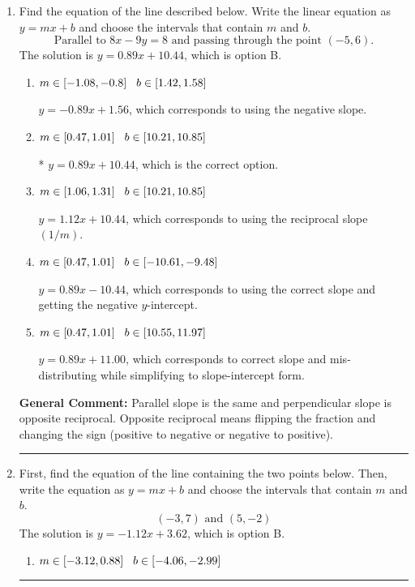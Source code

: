 \documentclass{extbook}[14pt]
\newcommand{\litem}[1]{\item #1

\rule{\textwidth}{0.4pt}}
\begin{document}
\begin{enumerate}\litem{
Find the equation of the line described below. Write the linear equation as $ y=mx+b $ and choose the intervals that contain $m$ and $b$.
\[ \text{Parallel to } 8 x - 9 y = 8 \text{ and passing through the point } (-5, 6). \]The solution is \( y = 0.89x + 10.44 \), which is option B.\begin{enumerate}[label=\Alph*.]
\item \( m \in [-1.08, -0.8] \hspace*{3mm} b \in [1.42, 1.58] \)

 $y = -0.89x + 1.56$, which corresponds to using the negative slope.
\item \( m \in [0.47, 1.01] \hspace*{3mm} b \in [10.21, 10.85] \)

* $y = 0.89x + 10.44$, which is the correct option.
\item \( m \in [1.06, 1.31] \hspace*{3mm} b \in [10.21, 10.85] \)

 $y = 1.12x + 10.44$, which corresponds to using the reciprocal slope $(1/m)$.
\item \( m \in [0.47, 1.01] \hspace*{3mm} b \in [-10.61, -9.48] \)

 $y = 0.89x - 10.44$, which corresponds to using the correct slope and getting the negative $y$-intercept.
\item \( m \in [0.47, 1.01] \hspace*{3mm} b \in [10.55, 11.97] \)

 $y = 0.89x + 11.00$, which corresponds to correct slope and mis-distributing while simplifying to slope-intercept form.
\end{enumerate}

\textbf{General Comment:} Parallel slope is the same and perpendicular slope is opposite reciprocal. Opposite reciprocal means flipping the fraction and changing the sign (positive to negative or negative to positive).
}
\litem{
First, find the equation of the line containing the two points below. Then, write the equation as $ y=mx+b $ and choose the intervals that contain $m$ and $b$.
\[ (-3, 7) \text{ and } (5, -2) \]The solution is \( y = -1.12x + 3.62 \), which is option B.\begin{enumerate}[label=\Alph*.]
\item \( m \in [-3.12, 0.88] \hspace*{3mm} b \in [-4.06, -2.99] \)


\end{enumerate}}
\end{enumerate}
\end{document}
